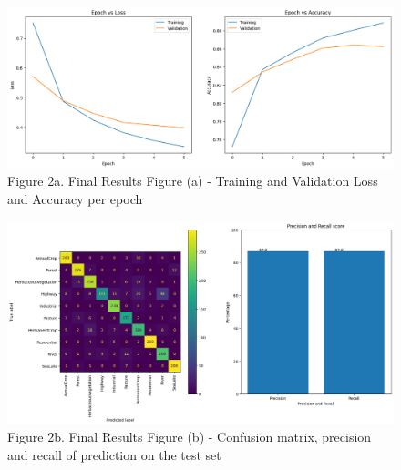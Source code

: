 \documentclass[acmtog]{acmart}
\begin{document}
	\begin{figure}[h]
		\centering
		\includegraphics[scale=0.5]{../src/images/FinalResults/Final_Results_figure_a.png}\\
		Figure 2a. Final Results Figure (a) - Training and Validation Loss and Accuracy per epoch
		
		\vspace{2cm}
		
		\centering
		\includegraphics[scale=0.5]{../src/images/FinalResults/Final_Results_figure_b.png}\\
		Figure 2b. Final Results Figure (b) - Confusion matrix, precision and recall of prediction on the test set
	\end{figure}
	
\end{document}
